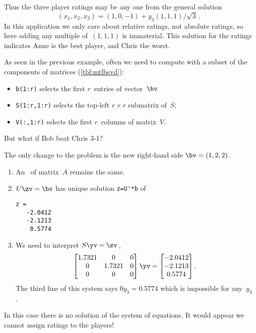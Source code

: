 \begin{example}
\begin{solution}
Thus the three player ratings may be any one from the general solution
\begin{displaymath}
    (x_1,x_2,x_3) =(1,0,-1)
    +y_3(1,1,1)/\sqrt3\,.
\end{displaymath}
In this application we only care about relative ratings, not absolute ratings, so here adding any multiple of~\((1,1,1)\) is immaterial.
This solution for the ratings indicates Anne is the best player, and Chris the worst. 
\end{solution}
\end{example}


\begin{compute}
As seen in the previous example, often we need to compute with a subset of the components of matrices (\autoref{tbl:mtlbsvd}):
\begin{itemize}
\item \verb|b(1:r)| selects the first \(r\)~entries of vector~\(\bv\)
\item \verb|S(1:r,1:r)| selects the top-left \(r\times r\) submatrix of~\(S\);
\item \verb|V(:,1:r)| selects the first \(r\)~columns of matrix~\(V\).
\end{itemize}
\end{compute}



\begin{example} \label{eg:rstp2}
But what if Bob beat Chris 3-1?  
\begin{solution} 
The only change to the problem is the new right-hand side \(\bv=(1,2,2)\).
\begin{enumerate}
\item An \svd\ of matrix~\(A\) remains the same.
\item \(U\zv=\bv\) has unique solution \verb|z=U'*b| of
\begin{verbatim}
z =
   -2.0412
   -2.1213
    0.5774
\end{verbatim}
\item We need to interpret \(S\yv=\zv\)\,,
\begin{equation*}
\begin{bmatrix} 1.7321&0&0
\\0&1.7321&0
\\0&0&0 \end{bmatrix}\yv=\begin{bmatrix} 
   -2.0412\\-2.1213\\0.5774
\end{bmatrix}.
\end{equation*}
The third line of this system says \(0y_3=0.5774\) which is impossible for any~\(y_3\).
\end{enumerate}
In this case there is no solution of the system of equations.
It would appear we cannot assign ratings to the players!  
\end{solution}
\end{example}

